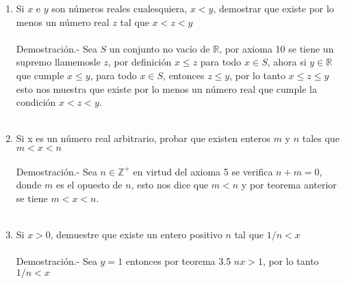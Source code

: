 \begin{enumerate}[\bfseries  1.]
\item Si $x$ e $y$ son números reales cualesquiera, $x<y$, demostrar que existe por lo menos un número real $z$ tal que $x<z<y$\\\\
Demostración.- \; Sea $S$ un conjunto no vacío de $\mathbb{R}$, por axioma 10 se tiene un supremo llamemosle $z$, por definición $x\leq z$ para todo $x\in S$, ahora si $y\in \mathbb{R}$ \; que cumple $x\leq y$, para todo $x\in S$, entonces $z\leq y$, por lo tanto $x\leq z \leq y$ esto  nos muestra que existe por lo menos un número real que cumple la condición $x<z<y$. \\\\

\item Si x es un número real arbitrario, probar que existen enteros $m$ y $n$ tales que $m<x<n$\\\\
Demostración.- \;  Sea $n\in \mathbb{Z}^+$ en virtud del axioma 5 se verifica $n+m=0$, donde $m$ es el opuesto de $n$, esto nos dice que $m<n$ y por teorema anterior se tiene $m<x<n$.\\\\

\item Si $x>0$, demuestre que existe un entero positivo $n$ tal que $1/n<x$\\\\
Demostración.- \; Sea $y=1$ entonces por teorema 3.5 \; $nx>1$, por lo tanto $1/n<x$ \\\\


\end{enumerate}
